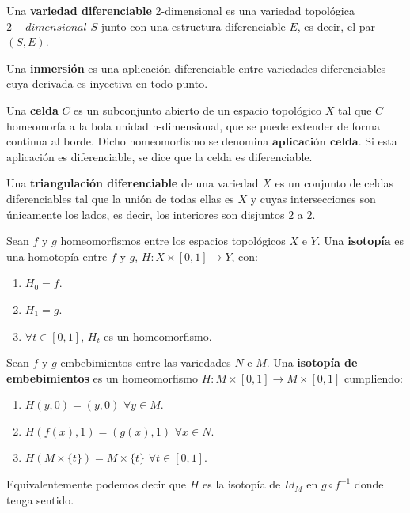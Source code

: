 \begin{definicion} Una \textbf{variedad diferenciable} 2-dimensional es una variedad topológica $2-dimensional$ $S$ junto con una estructura diferenciable $E$, es decir, el par $(S, E)$.
\end{definicion}

\begin{definicion} Una \textbf{inmersión} es una aplicación diferenciable entre variedades diferenciables cuya derivada es inyectiva en todo punto.
\end{definicion}

\begin{definicion} Una \textbf{celda} $C$ es un subconjunto abierto de un espacio topológico $X$ tal que $C$ homeomorfa a la bola unidad n-dimensional, que se puede extender de forma continua al borde. Dicho homeomorfismo se denomina $\textbf{aplicación celda}$. Si esta aplicación es diferenciable, se dice que la celda es diferenciable.
\end{definicion}

\begin{definicion} Una \textbf{triangulación diferenciable} de una variedad $X$ es un conjunto de celdas diferenciables tal que la unión de todas ellas es $X$ y cuyas intersecciones son únicamente los lados, es decir, los interiores son disjuntos $2$ a $2$.
\end{definicion}
\newpage
\begin{definicion} Sean $f$ y $g$ homeomorfismos entre los espacios topológicos $X$ e $Y$. Una \textbf{isotopía} es una homotopía entre $f$ y $g$, $H: X \times [0,1] \rightarrow Y$, con:
	\begin{enumerate}
		\item $H_0 = f$.
		\item $H_1 = g$.
		\item $\forall t \in [0,1]$, $H_t$ es un homeomorfismo.
	\end{enumerate}
\end{definicion}

\begin{definicion} Sean $f$ y $g$ embebimientos entre las variedades $N$ e $M$. Una \textbf{isotopía de embebimientos} es un homeomorfismo $H: M \times [0,1] \rightarrow M \times [0,1]$ cumpliendo:
	\begin{enumerate}
		\item $H(y, 0) = (y, 0)$ $\forall y \in M$.
		\item $H(f(x), 1) = (g(x), 1)$ $\forall x \in N$.
		\item $H(M \times \{t\}) = M \times \{t\}$ $\forall t \in [0,1]$.
	\end{enumerate}
	
	Equivalentemente podemos decir que $H$ es la isotopía de $Id_M$ en $g \circ f^{-1}$ donde tenga sentido.
\end{definicion}

